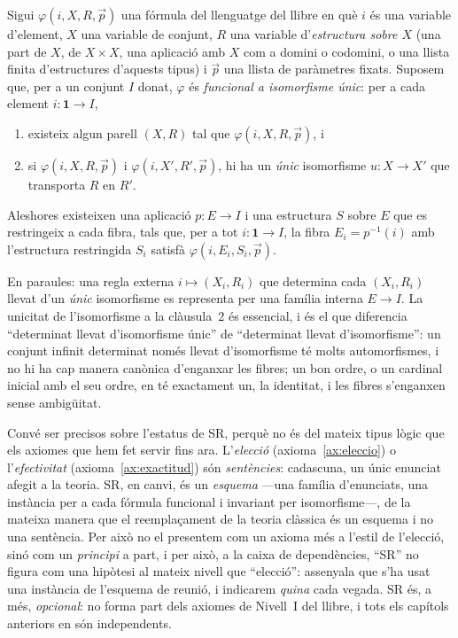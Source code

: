 \begin{principi}\label{sr:esquema}
Sigui \(\varphi(i,X,R,\vec p)\) una fórmula del llenguatge del llibre en què
\(i\) és una variable d'element, \(X\) una variable de conjunt, \(R\) una
variable d'\emph{estructura sobre \(X\)} (una part de \(X\), de \(X\times X\),
una aplicació amb \(X\) com a domini o codomini, o una llista finita
d'estructures d'aquests tipus) i \(\vec p\) una llista de
paràmetres fixats. Suposem que, per a un conjunt \(I\) donat, \(\varphi\) és
\emph{funcional a isomorfisme únic}: per a cada element \(i\colon\mathbf1\to I\),
\begin{enumerate}
  \item existeix algun parell \((X,R)\) tal que \(\varphi(i,X,R,\vec p)\), i
  \item si \(\varphi(i,X,R,\vec p)\) i \(\varphi(i,X',R',\vec p)\), hi ha un
    \emph{únic} isomorfisme \(u\colon X\to X'\) que transporta \(R\) en \(R'\).
\end{enumerate}
Aleshores existeixen una aplicació \(p\colon E\to I\) i una estructura
\(S\) sobre \(E\) que es restringeix a cada fibra, tals que, per a tot
\(i\colon\mathbf1\to I\), la fibra \(E_i=p^{-1}(i)\) amb l'estructura
restringida \(S_i\) satisfà \(\varphi(i,E_i,S_i,\vec p)\).
\end{principi}

En paraules: una regla externa \(i\mapsto(X_i,R_i)\) que determina cada
\((X_i,R_i)\) llevat d'un \emph{únic} isomorfisme es representa per una família
interna \(E\to I\). La unicitat de l'isomorfisme a la clàusula~2 és essencial, i
és el que diferencia \enquote{determinat llevat d'isomorfisme únic} de
\enquote{determinat llevat d'isomorfisme}: un conjunt infinit determinat només
llevat d'isomorfisme té molts automorfismes, i no hi ha cap manera canònica
d'enganxar les fibres; un bon ordre, o un cardinal inicial amb el seu ordre, en
té exactament un, la identitat, i les fibres s'enganxen sense ambigüitat.

\begin{observacio}\label{obs:sr-esquema-opcional}
Convé ser precisos sobre l'estatus de SR, perquè no és del mateix tipus lògic
que els axiomes que hem fet servir fins ara. L'\emph{elecció}
(axioma~\ref{ax:eleccio}) o l'\emph{efectivitat} (axioma~\ref{ax:exactitud})
són \emph{sentències}: cadascuna, un únic enunciat afegit a la teoria. SR, en
canvi, és un \emph{esquema} ---una família d'enunciats, una instància per a
cada fórmula funcional i invariant per isomorfisme---, de la mateixa manera que
el reemplaçament de la teoria clàssica és un esquema i no una sentència. Per
això no el presentem com un axioma més a l'estil de l'elecció, sinó com un
\emph{principi} a part, i per això, a la caixa de dependències, \enquote{SR} no
figura com una hipòtesi al mateix nivell que \enquote{elecció}: assenyala que
s'ha usat una instància de l'esquema de reunió, i indicarem \emph{quina} cada
vegada. SR és, a més, \emph{opcional}: no forma part dels axiomes de Nivell~I
del llibre, i tots els capítols anteriors en són independents.
\end{observacio}

